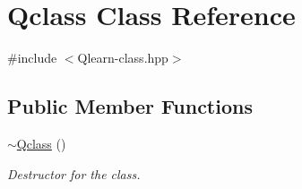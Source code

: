 \hypertarget{classQclass}{}\section{Qclass Class Reference}
\label{classQclass}


{\ttfamily \#include $<$Qlearn-\/class.\+hpp$>$}

\subsection*{Public Member Functions}
\begin{DoxyCompactItemize}
\item 
\hyperlink{classQclass_ab6bd1cc95cf90e0c1759ba26f57bd5a3}{$\sim$\+Qclass} ()
\begin{DoxyCompactList}\small\item\em Destructor for the class. \end{DoxyCompactList}\end{DoxyCompactItemize}
